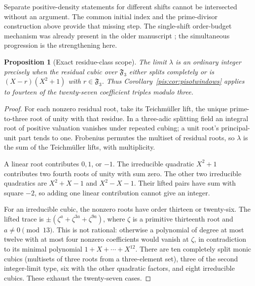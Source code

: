 \documentclass[11pt,a4paper]{article}
\newtheorem{proposition}[theorem]{Proposition}
\theoremstyle{definition}\newtheorem{definition}[theorem]{Definition}
\theoremstyle{remark}\newtheorem{remark}[theorem]{Remark}
\newcommand{\F}{\mathfrak F}\newcommand{\FF}{\mathbb F}
\begin{document}
Separate positive-density statements for different shifts cannot
be intersected without an argument. The common initial index and
the prime-divisor construction above provide that missing step.
The single-shift order-budget mechanism was already present in the
older manuscript \cite{Keio009}; the simultaneous progression is
the strengthening here.

\begin{proposition}[Exact residue-class scope]\label{pis:prop:fourteen}
The limit $\lambda$ is an ordinary integer precisely when the
residual cubic over $\F_3$ either splits completely or is
$(X-r)(X^2+1)$ with $r\in\F_3$. Thus
Corollary~\ref{pis:cor:pisotwindows} applies to fourteen of the
twenty-seven coefficient triples modulo three.
\end{proposition}
\begin{proof}
For each nonzero residual root, take its Teichm\"uller lift, the
unique prime-to-three root of unity with that residue. In a
three-adic splitting field an integral root of positive valuation
vanishes under repeated cubing; a unit root's principal-unit part
tends to one. Frobenius permutes the multiset of residual roots,
so $\lambda$ is the sum of the Teichm\"uller lifts, with
multiplicity.

A linear root contributes $0,1$, or $-1$. The irreducible quadratic
$X^2+1$ contributes two fourth roots of unity with sum zero. The
other two irreducible quadratics are $X^2+X-1$ and $X^2-X-1$.
Their lifted pairs have sum with square $-2$, so adding one linear
contribution cannot give an integer.

For an irreducible cubic, the nonzero roots have order thirteen or
twenty-six. The lifted trace is
$\pm(\zeta^a+\zeta^{3a}+\zeta^{9a})$, where $\zeta$ is a
primitive thirteenth root and $a\ne0\pmod{13}$. This is not
rational: otherwise a polynomial of degree at most twelve with
at most four nonzero coefficients would vanish at $\zeta$, in
contradiction to its minimal polynomial
$1+X+\cdots+X^{12}$. There are ten completely split monic cubics
(multisets of three roots from a three-element set), three of the
second integer-limit type, six with the other quadratic factors,
and eight irreducible cubics. These exhaust the twenty-seven cases.
\end{proof}
\end{document}
